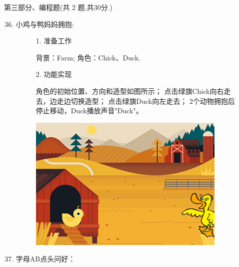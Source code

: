 \documentclass[10.5pt, a4paper]{article}
\begin{document}
    \newpage
    {\noindent\heiti 第三部分、编程题(共 2 题,共30分.)}
    \begin{enumerate}
        \setcounter{enumi}{35}
    
        \item 小鸡与鸭妈妈拥抱:
        \begin{figure}[htbp]
            \begin{minipage}{.6\textwidth}
                1. 准备工作
                \begin{tasks}[label = (\arabic*)]
                    \task 背景：Farm;
                    \task 角色：Chick、Duck.
                \end{tasks}
                2. 功能实现
                \begin{tasks}[label = (\arabic*)]
                    \task 角色的初始位置、方向和造型如图所示；
                    \task 点击绿旗Chick向右走去，边走边切换造型；
                    \task 点击绿旗Duck向左走去；
                    \task 2个动物拥抱后停止移动，Duck播放声音"Duck"。
                \end{tasks}
            \end{minipage}
            \begin{minipage}{.37\textwidth}
                \centering
                \includegraphics[width=\textwidth]{36.png}
            \end{minipage}
        \end{figure}

        \item 字母AB点头问好：
        

\end{enumerate}
\end{document}
